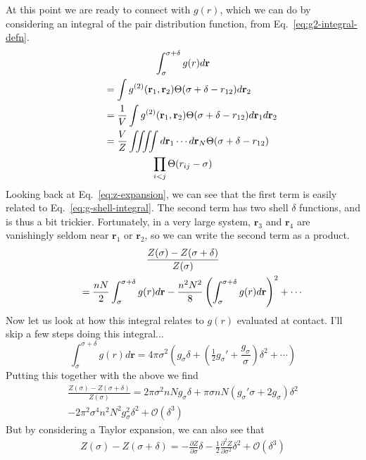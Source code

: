 \documentclass[letterpaper,twocolumn,amsmath,amssymb,pre,aps,10pt]{revtex4-1}
\newcommand{\rr}{\textbf{r}}
\begin{document}
At this point we are ready to connect with $g(r)$, which we can do by
considering an integral of the pair distribution function, from
Eq.~\ref{eq:g2-integral-defn}.
\begin{multline}
  \int_{\sigma}^{\sigma+\delta} g(r) d\rr\\
  \shoveleft{\quad= \int g^{(2)}(\rr_1,\rr_2)
  \Theta(\sigma+\delta-r_{12})d\rr_2} \\
  \shoveleft{\quad= \frac{1}{V}\int g^{(2)}(\rr_1,\rr_2)
  \Theta(\sigma+\delta-r_{12})d\rr_1d\rr_2} \\
  \shoveleft{\quad= \frac{V}{Z}\iiiint d\rr_1\cdots d\rr_N
  \Theta(\sigma+\delta-r_{12})}\\
  \prod_{i<j} \Theta(r_{ij}-\sigma)
  \label{eq:g-shell-integral}
\end{multline}
Looking back at Eq.~\ref{eq:z-expansion}, we can see that the first
term is easily related to Eq.~\ref{eq:g-shell-integral}.  The second
term has two shell $\delta$ functions, and is thus a bit trickier.
Fortunately, in a very large system, $\rr_3$ and $\rr_4$ are
vanishingly seldom near $\rr_1$ or $\rr_2$, so we can write the second
term as a product.
\begin{multline}
  \frac{Z(\sigma)-Z(\sigma+\delta)}{Z(\sigma)}\\
  \shoveleft{\quad= \frac{nN}{2} \int_{\sigma}^{\sigma+\delta} g(r) d\rr }
  - \frac{n^2N^2}{8} \left(\int_{\sigma}^{\sigma+\delta} g(r)
  d\rr\right)^2
  + \cdots
  \label{eq:zdiff-g}
\end{multline}
Now let us look at how this integral relates to $g(r)$ evaluated at
contact.  I'll skip a few steps doing this integral...
\begin{equation}
   \int_{\sigma}^{\sigma+\delta} g(r)
  d\rr = 4\pi\sigma^2\left(g_\sigma\delta + \left(\tfrac12g_\sigma' +
  \frac{g_\sigma}{\sigma}\right)\delta^2 + \cdots \right)
\end{equation}
Putting this together with the above we find
\begin{multline}
  \frac{Z(\sigma)-Z(\sigma+\delta)}{Z(\sigma)} =
  2\pi\sigma^2 n N g_\sigma \delta +
  \pi\sigma n N  \left(g_\sigma'\sigma + 2g_\sigma\right)
  \delta^2 \\
  - 2\pi^2\sigma^4n^2N^2g_\sigma^2\delta^2 + \mathcal{O}(\delta^3)
\end{multline}
But by considering a Taylor expansion, we can also see that
\begin{multline}
  Z(\sigma)-Z(\sigma+\delta) =
  -\frac{\partial Z}{\partial \sigma} \delta
  -\frac12 \frac{\partial^2 Z}{\partial \sigma^2} \delta^2  + \mathcal{O}(\delta^3)
\end{multline}
\end{document}
